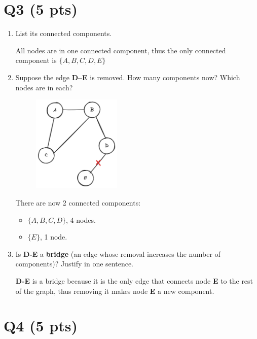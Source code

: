 \documentclass{article}
\begin{document}
\section*{Q3 (5 pts)}

\begin{enumerate}
    \item {
        List its connected components.

        All nodes are in one connected component, thus the only connected
        component is \(\{A, B, C, D, E\}\)
    }

    \item {
        Suppose the edge \textbf{D–E} is removed.
        How many components now? Which nodes are in each?

        \begin{figure}[htbp]
            \centering
            \includegraphics[width=0.4\textwidth]{graph_no_DE.png}
        \end{figure}

        There are now 2 connected components:
        \begin{itemize}
            \item \(\{A, B, C, D\}\), 4 nodes.
            \item \(\{E\}\), 1 node.
        \end{itemize}
    }

    \item {
        Is \textbf{D-E} a \textbf{bridge} (an edge whose removal increases the 
        number of components)? Justify in one sentence.

        \textbf{D-E} is a bridge because it is the only edge that connects node 
        \textbf{E} to the rest of the graph, thus removing it makes node \textbf{E}
        a new component.
    }
\end{enumerate}

\section*{Q4 (5 pts)}
\end{document}
